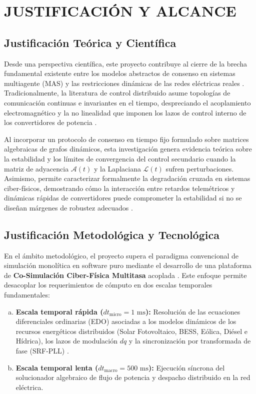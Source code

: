 \section{JUSTIFICACIÓN Y ALCANCE}
\label{sec:justificacion}

\subsection{Justificación Teórica y Científica}
Desde una perspectiva científica, este proyecto contribuye al cierre de la brecha fundamental existente entre los modelos abstractos de consenso en sistemas multiagente (MAS) y las restricciones dinámicas de las redes eléctricas reales \citep{Altin2023MultiAgent}. Tradicionalmente, la literatura de control distribuido asume topologías de comunicación continuas e invariantes en el tiempo, despreciando el acoplamiento electromagnético y la no linealidad que imponen los lazos de control interno de los convertidores de potencia \citep{Shrivastava2023FiniteTime}.

Al incorporar un protocolo de consenso en tiempo fijo formulado sobre matrices algebraicas de grafos dinámicos, esta investigación genera evidencia teórica sobre la estabilidad y los límites de convergencia del control secundario cuando la matriz de adyacencia $\mathcal{A}(t)$ y la Laplaciana $\mathcal{L}(t)$ sufren perturbaciones. Asimismo, permite caracterizar formalmente la degradación cruzada en sistemas ciber-físicos, demostrando cómo la interacción entre retardos telemétricos y dinámicas rápidas de convertidores puede comprometer la estabilidad si no se diseñan márgenes de robustez adecuados \citep{Olayanju2025ConsensusFreq, Barzegari2022Resilient}.

\subsection{Justificación Metodológica y Tecnológica}
En el ámbito metodológico, el proyecto supera el paradigma convencional de simulación monolítica en software puro mediante el desarrollo de una plataforma de \textbf{Co-Simulación Ciber-Física Multitasa} acoplada \citep{Gomes2022FMI30}. Este enfoque permite desacoplar los requerimientos de cómputo en dos escalas temporales fundamentales:
\begin{enumerate}[a)]
    \item \textbf{Escala temporal rápida ($dt_{\text{micro}} = 1\text{ ms}$):} Resolución de las ecuaciones diferenciales ordinarias (EDO) asociadas a los modelos dinámicos de los recursos energéticos distribuidos (Solar Fotovoltaico, BESS, Eólica, Diésel e Hídrica), los lazos de modulación $dq$ y la sincronización por transformada de fase (SRF-PLL) \citep{Kundu2024ICCFPLL}.
    \item \textbf{Escala temporal lenta ($dt_{\text{macro}} = 500\text{ ms}$):} Ejecución síncrona del solucionador algebraico de flujo de potencia y despacho distribuido en la red eléctrica.
\end{enumerate}

